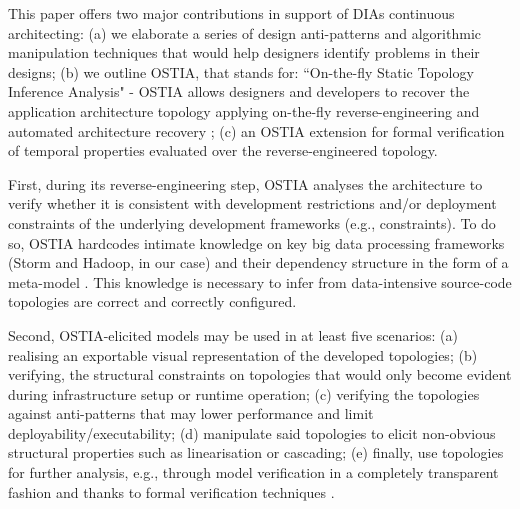 
This paper offers two major contributions in support of DIAs continuous architecting: (a) we elaborate a series of design anti-patterns and algorithmic manipulation techniques that would help designers identify problems in their designs; (b) we outline OSTIA, that stands for: ``On-the-fly Static Topology Inference Analysis" - OSTIA allows designers and developers to recover the application architecture topology applying on-the-fly reverse-engineering and automated architecture recovery \cite{archrec}; (c) an OSTIA extension for formal verification of temporal properties evaluated over the reverse-engineered topology. 

First, during its reverse-engineering step, OSTIA analyses the architecture to verify whether it is consistent with development restrictions and/or deployment constraints of the underlying development frameworks (e.g., constraints). To do so, OSTIA hardcodes intimate knowledge on key big data processing frameworks (Storm and Hadoop, in our case) and their dependency structure in the form of a meta-model \cite{mda}. This knowledge is necessary to infer from data-intensive source-code topologies are correct and correctly configured. 

Second, OSTIA-elicited models may be used in at least five scenarios: (a) realising an exportable visual representation of the developed topologies; (b) verifying, the structural constraints on topologies that would only become evident during infrastructure setup or runtime operation; (c) verifying the topologies against anti-patterns \cite{patternoriented2000} that may lower performance and limit deployability/executability; (d) manipulate said topologies to elicit non-obvious structural properties such as linearisation or cascading; (e) finally, use topologies for further analysis, e.g., through model verification in a completely transparent fashion and thanks to formal verification techniques \cite{icsoft}. 

